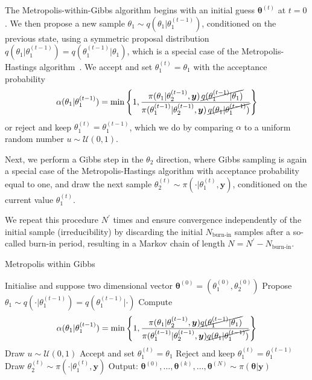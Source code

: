 The Metropolis-within-Gibbs algorithm begins with an initial guess $\bm{\theta}^{(t)}$ at $t=0$. We then propose a new sample $\theta_1 \sim q(\theta_1 |  \theta_1^{(t-1)})$, conditioned on the previous state, using a symmetric proposal distribution $q(\theta_1 |  \theta_1^{(t-1)}) = q(\theta_1^{(t-1)} |  \theta_1)$, which is a special case of the Metropolis-Hastings algorithm~\cite{roberts2006harris}.
We accept and set $\theta_1^{(t)} = \theta_1$ with the acceptance probability
\begin{align}
	\alpha(\theta_1 |  \theta_1^{(t-1)}) = \min \left\{ 1, \frac{\pi(\theta_1 |  \theta_2^{(t-1)}, \bm{y}) \, \cancel{q(\theta_1^{(t-1)} |  \theta_1)}}{\pi(\theta_1^{(t-1)} |  \theta_2^{(t-1)}, \bm{y}) \, \cancel{q(\theta_1 |  \theta_1^{(t-1)})}} \right\}
\end{align}
or reject and keep $\theta_1^{(t)} = \theta_1^{(t-1)}$, which we do by comparing $\alpha$ to a uniform random number $u \sim \mathcal{U}(0,1)$. 

Next, we perform a Gibbs step in the $\theta_2$ direction, where Gibbs sampling is again a special case of the Metropolis-Hastings algorithm with acceptance probability equal to one, and draw the next sample $\theta_2^{(t)} \sim \pi(\cdot |  \theta_1^{(t)}, \bm{y})$, conditioned on the current value $\theta_1^{(t)}$. 

We repeat this procedure $N^{\prime}$ times and ensure convergence independently of the initial sample (irreducibility) by discarding the initial $N_{\text{burn-in}}$ samples after a so-called burn-in period, resulting in a Markov chain of length $N = N^{\prime} - N_{\text{burn-in}}$.

\begin{algorithm}[!ht]
	\caption{Metropolis within Gibbs}
	\begin{algorithmic}[1]
		\STATE Initialise and suppose two dimensional vector \( \bm{\theta}^{(0)}  =( \theta_1^{(0)} , \theta_2^{(0)}  ) \)
		\STATE Propose \( \theta_1 \sim q(\cdot   | \theta_1 ^{(t-1)}) = q(\theta_1 ^{(t-1)} |\cdot  ) \)
		\STATE Compute
		\[ \alpha( \theta_1  | \theta_1^{(t-1)}) = \min \left\{ 1, \frac{\pi(\theta_1  | \theta^{(t-1)}_2, \bm{y}) \cancel{q(\theta_1^{(t-1)} | \theta_1 ) } }{\pi(\theta_1^{(t-1)}| \theta_2^{(t-1)}, \bm{y}) \cancel{q(\theta_1 | \theta_1^{(t-1)})} } \right\} \]
		\STATE Draw $u \sim \mathcal{U}(0,1)$
		\STATE Accept and set \( \theta_1^{(t)} = \theta_1 \)
		\ELSE  
		\STATE Reject and keep \(\theta_1^{(t)} = \theta_1^{(t-1)} \)
		\ENDIF
		\STATE Draw \(\theta_2^{(t)} \sim  \pi( \cdot | \theta_1^{(t)} , \bm{y} )\) 
		\ENDFOR
		\STATE Output: $ \bm{\theta}^{(0)}, \dots,  \bm{\theta}^{(k)} , \dots,   \bm{\theta}^{(N)} \sim \pi(\bm{\theta}| \bm{y}) $
	\end{algorithmic}
\end{algorithm}


